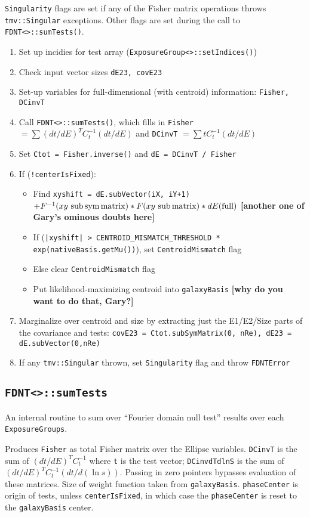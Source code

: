 \documentclass[useAMS,usenatbib,usegraphicx]{mn2e}
\begin{document}
{\tt Singularity} flags are set if any of the Fisher matrix operations throws {\tt tmv::Singular}
exceptions.  Other flags are set during the call to {\tt FDNT<>::sumTests()}.
\begin{enumerate}
\item Set up incidies for test array ({\tt ExposureGroup<>::setIndices()})
\item Check input vector sizes {\tt dE23, covE23}
\item Set-up variables for full-dimensional (with centroid) information: {\tt Fisher, DCinvT}
\item Call {\tt FDNT<>::sumTests()}, which fills in {\tt Fisher} $=\sum(dt/dE)^T C^{-1}_t (dt/dE)$
  and {\tt DCinvT} $=\sum t C^{-1}_t (dt/dE)$
\item Set {\tt Ctot = Fisher.inverse()} and {\tt dE = DCinvT / Fisher}
\item If ({\tt !centerIsFixed}):
  \begin{itemize}
  \item Find {\tt xyshift = dE.subVector(iX, iY+1)} 
    $+ F^{-1}(xy\ {\rm sub\,sym\,matrix}) * F(xy\ {\rm sub\,matrix}) * dE({\rm full})$
    {\bf [another one of Gary's ominous doubts here]}
  \item If ({\tt |xyshift| > CENTROID\_MISMATCH\_THRESHOLD * exp(nativeBasis.getMu())}), 
    set {\tt CentroidMismatch} flag
  \item Else clear {\tt CentroidMismatch} flag
  \item Put likelihood-maximizing centroid into {\tt galaxyBasis} 
    {\bf [why do you want to do that, Gary?]}
  \end{itemize}
\item Marginalize over centroid and size by extracting just the E1/E2/Size parts of the 
  covariance and tests: {\tt covE23 = Ctot.subSymMatrix(0, nRe), dE23 = dE.subVector(0,nRe)}
\item If any {\tt tmv::Singular} thrown, set {\tt Singularity} flag and throw {\tt FDNTError}
\end{enumerate}

\subsection{\texttt{FDNT<>::sumTests}}
An internal routine to sum over ``Fourier domain null test'' results over each {\tt ExposureGroups}.

Produces {\tt Fisher} as total Fisher matrix over the Ellipse variables.
{\tt DCinvT} is the sum of $(dt/dE)^T C_t^{-1}$ where {\tt t} is the test vector;
{\tt DCinvdTdlnS} is the sum of $(dt/dE)^T C_t^{-1} (dt/d(\ln s))$.
Passing in zero pointers bypasses evaluation of these matrices.
Size of weight function taken from {\tt galaxyBasis}.  
{\tt phaseCenter} is origin of tests, unless {\tt centerIsFixed}, in which case the 
{\tt phaseCenter} is reset to the {\tt galaxyBasis} center.
\end{document}
